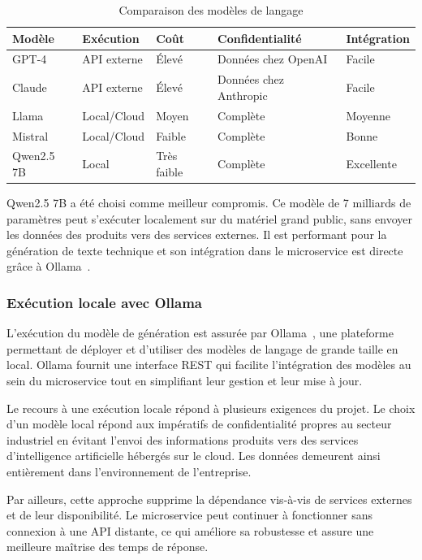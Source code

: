 \begin{table}[H]
\centering
\caption{Comparaison des modèles de langage}
\label{tab:comparaison_llm}
\renewcommand{\arraystretch}{1.4}
\begin{tabular}{|p{2.5cm}|p{2.5cm}|p{1.5cm}|p{4.7cm}|p{2.3cm}|}
\hline
\textbf{Modèle} & \textbf{Exécution} & \textbf{Coût} & \textbf{Confidentialité} & \textbf{Intégration} \\
\hline
GPT-4 & API externe & Élevé & Données chez OpenAI & Facile \\
Claude & API externe & Élevé & Données chez Anthropic & Facile \\
Llama & Local/Cloud & Moyen & Complète & Moyenne \\
Mistral & Local/Cloud & Faible & Complète & Bonne \\
Qwen2.5 7B & Local & Très faible & Complète & Excellente \\
\hline
\end{tabular}
\end{table}

Qwen2.5 7B a été choisi comme meilleur compromis. Ce modèle de 7 milliards de paramètres peut s'exécuter localement sur du matériel grand public, sans envoyer les données des produits vers des services externes. Il est performant pour la génération de texte technique et son intégration dans le microservice est directe grâce à Ollama~\cite{ollama}.

\subsubsection{Exécution locale avec Ollama}

L'exécution du modèle de génération est assurée par Ollama~\cite{ollama}, une plateforme permettant de déployer et d'utiliser des modèles de langage de grande taille en local. Ollama fournit une interface REST qui facilite l'intégration des modèles au sein du microservice tout en simplifiant leur gestion et leur mise à jour.

Le recours à une exécution locale répond à plusieurs exigences du projet. Le choix d'un modèle local répond aux impératifs de confidentialité propres au secteur industriel en évitant l'envoi des informations produits vers des services d'intelligence artificielle hébergés sur le cloud. Les données demeurent ainsi entièrement dans l'environnement de l'entreprise.

Par ailleurs, cette approche supprime la dépendance vis-à-vis de services externes et de leur disponibilité. Le microservice peut continuer à fonctionner sans connexion à une API distante, ce qui améliore sa robustesse et assure une meilleure maîtrise des temps de réponse.


